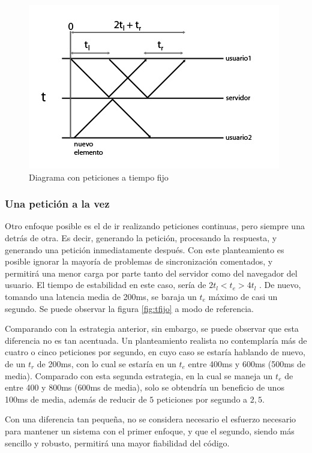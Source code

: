 \begin{figure}[h!]
\centering
\includegraphics[totalheight=7cm]{tfijoverdad.jpg}
\caption{Diagrama con peticiones a tiempo fijo}\label{fig:tfijoverdad}
\end{figure}


\subsubsection{Una petición a la vez} %
\label{ssub:una_peticion_a_la_vez}
Otro enfoque posible es el de ir realizando peticiones continuas, pero siempre una detrás de otra. Es decir, generando la petición, procesando la respuesta, y generando una petición inmediatamente después. Con este planteamiento es posible ignorar la mayoría de problemas de sincronización comentados, y permitirá una menor carga por parte tanto del servidor como del navegador del usuario. El tiempo de estabilidad en este caso, sería de $ 2t_l < t_e > 4t_l$ . De nuevo, tomando una latencia media de 200ms, se baraja un $t_e$ máximo de casi un segundo. Se puede observar la figura \ref{fig:tfijo} a modo de referencia.

Comparando con la estrategia anterior, sin embargo, se puede observar que esta diferencia no es tan acentuada. Un planteamiento realista no contemplaría más de cuatro o cinco peticiones por segundo, en cuyo caso se estaría hablando de nuevo, de un $t_r$ de 200ms, con lo cual se estaría en un $t_e$ entre 400ms y 600ms (500ms de media). Comparado con esta segunda estrategia, en la cual se maneja un $t_e$ de entre 400 y 800ms (600ms de media), solo se obtendría un beneficio de unos 100ms de media, además de reducir de $5$ peticiones por segundo a $2,5$.

Con una diferencia tan pequeña, no se considera necesario el esfuerzo necesario para mantener un sistema con el primer enfoque, y que el segundo, siendo más sencillo y robusto, permitirá una mayor fiabilidad del código.

